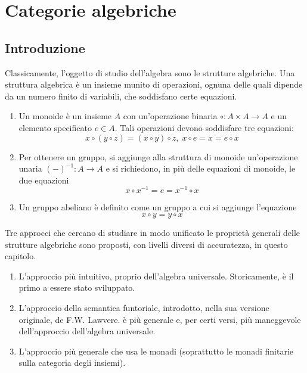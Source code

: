 \chapter{Categorie algebriche}\label{cap_cat_alg}

\section{Introduzione}\label{sec_intro}

Classicamente, l'oggetto di studio dell'algebra sono le strutture algebriche. Una struttura algebrica è un insieme munito di operazioni,
ognuna delle quali dipende da un numero finito di variabili, che soddisfano certe equazioni. 

\begin{examples}\label{esempi_strutture_alg}\leavevmode
\begin{enumerate}
\item Un monoide è un insieme $A$ con un'operazione binaria $\circ \colon A \times A \to A$ e un elemento specificato $e \in A$. Tali
operazioni devono soddisfare tre equazioni: 
\[
  x \circ (y \circ z) = (x \circ y) \circ z, \; x \circ e = x = e \circ x 
\]
\item Per ottenere un gruppo, si aggiunge alla struttura di monoide un'operazione unaria $(-)^{-1} \colon A \to A$ e si richiedono, in più
delle equazioni di monoide, le due equazioni
\[
  x \circ x^{-1} = e = x^{-1} \circ x
\]
\item Un gruppo abeliano è definito come un gruppo a cui si aggiunge l'equazione
\[
  x \circ y = y \circ x
\]
\end{enumerate} 
\end{examples} 

Tre approcci che cercano di studiare in modo unificato le proprietà generali delle strutture algebriche sono proposti, con livelli diversi di 
accuratezza, in questo capitolo.
\begin{enumerate}
\item L'approccio più intuitivo, proprio dell'algebra universale. Storicamente, è il primo a essere stato sviluppato.
\item L'approccio della semantica funtoriale, introdotto, nella sua versione originale, de F.W. Lawvere. è più generale e, per certi versi, più 
maneggevole dell'approccio dell'algebra universale.
\item L'approccio più generale che usa le monadi (soprattutto le monadi finitarie sulla categoria degli insiemi).
\end{enumerate}

